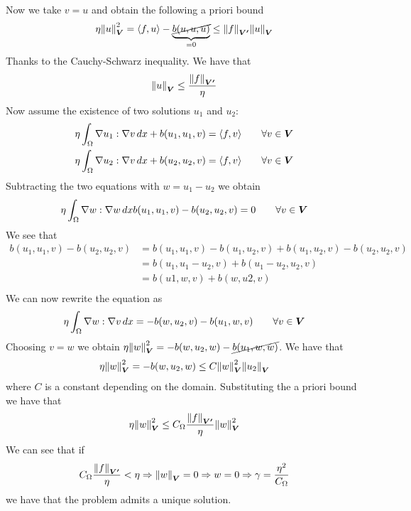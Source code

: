 \begin{enumerate}
\[\begin{split}
        \end{split}
    \]
    Now we take \(v = u\) and obtain the following a priori bound
    \[
        \begin{split}
            \eta \norm{u}_{\bm{V}}^2 = \langle f, u \rangle - \underbrace{\cancel{b(u, u, u)}}_{=0} \leq \norm{f}_{\bm{V'}} \norm{u}_{\bm{V}} 
        \end{split}
    \]
    Thanks to the Cauchy-Schwarz inequality. We have that 
    \[
        \begin{split}
            \norm{u}_{\bm{V}} \leq \frac{\norm{f}_{\bm{V'}}}{\eta}
        \end{split}
    \]
    Now assume the existence of two solutions \(u_1\) and \(u_2\):
    \begin{align*}
        \eta \int_\Omega \nabla u_1 : \nabla v \, dx + b(u_1, u_1, v) &= \langle f, v \rangle \qquad \forall v \in \bm{V} \\
        \eta \int_\Omega \nabla u_2 : \nabla v \, dx + b(u_2, u_2, v) &= \langle f, v \rangle \qquad \forall v \in \bm{V}
    \end{align*}
    Subtracting the two equations with \(w = u_1 - u_2\) we obtain
    \[
        \begin{split}
            \eta \int_\Omega \nabla w : \nabla w \, dx b(u_1, u_1, v) - b(u_2, u_2, v) = 0 \qquad \forall v \in \bm{V}
        \end{split}
    \]
    We see that 
    \begin{align*}
        b(u_1, u_1, v) - b(u_2, u_2, v) &= b(u_1, u_1, v) - b(u_1, u_2, v) + b(u_1, u_2, v) - b(u_2, u_2, v) \\
        &= b(u_1, u_1 - u_2, v) + b(u_1 - u_2, u_2, v) \\
        &= b(u1, w, v) + b(w, u2, v) \\
    \end{align*}
    We can now rewrite the equation as
    \[
        \begin{split}
            \eta \int_\Omega \nabla w : \nabla v \, dx= -b(w, u_2, v) - b(u_1, w, v) \qquad \forall v \in \bm{V}
        \end{split}
    \]
    Choosing \(v = w\) we obtain \(\eta \norm{w}_{\bm{V}}^2 = -b(w, u_2, w) - \cancel{b(u_1, w, w)}\). We have that
    \[
        \begin{split}
            \eta \norm{w}_{\bm{V}}^2 = -b(w, u_2, w) \leq C \norm{w}_{\bm{V}}^2 \norm{u_2}_{\bm{V}}
        \end{split}
    \]
    where \(C\) is a constant depending on the domain. Substituting the a priori bound we have that
    \[
        \begin{split}
             \eta \norm{w}_{\bm{V}}^2 \leq C_\Omega \frac{\norm{f}_{\bm{V'}}}{\eta} \norm{w}_{\bm{V}}^2
        \end{split}
    \]
    We can see that if
    \[
        \begin{split}
            C_\Omega \frac{\norm{f}_{\bm{V'}}}{\eta} < \eta \Rightarrow \norm{w}_{\bm{V}} = 0 \Rightarrow w = 0 \Rightarrow \gamma = \frac{\eta^2}{C_\Omega} 
        \end{split}
    \]
    we have that the problem admits a unique solution. 



\end{enumerate}
